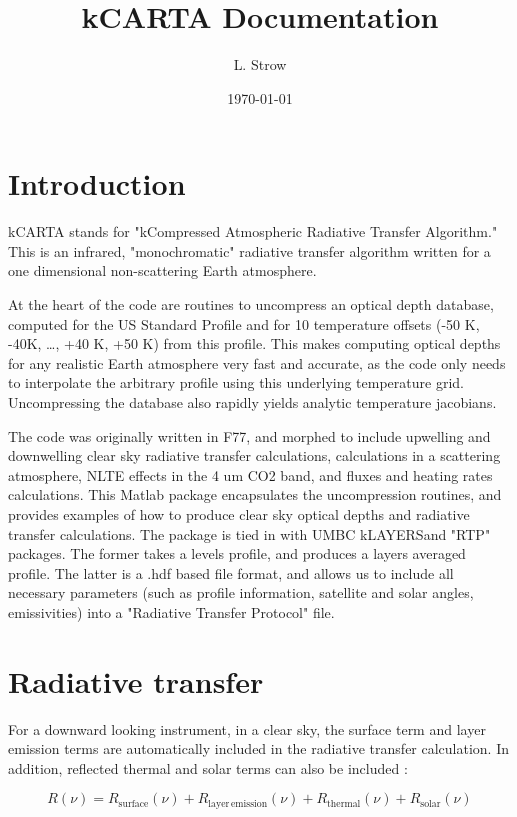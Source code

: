 \documentclass[11pt]{article}
\author{L. Strow}
\date{\today}
\title{kCARTA Documentation}
\begin{document}
\maketitle
\section{Introduction}
\label{sec-1}

kCARTA stands for "kCompressed Atmospheric Radiative Transfer
Algorithm." This is an infrared, "monochromatic" radiative transfer
algorithm written for a one dimensional non-scattering Earth atmosphere.

At the heart of the code are routines to uncompress an optical depth
database, computed for the US Standard Profile and for 10 temperature
offsets (-50 K, -40K, \ldots{}, +40 K, +50 K) from this profile. This makes
computing optical depths for any realistic Earth atmosphere very fast
and accurate, as the code only needs to interpolate the arbitrary
profile using this underlying temperature grid. Uncompressing the
database also rapidly yields analytic temperature jacobians.

The code was originally written in F77, and morphed to include upwelling
and downwelling clear sky radiative transfer calculations, calculations
in a scattering atmosphere, NLTE effects in the 4 um CO2 band, and
fluxes and heating rates calculations. This Matlab package encapsulates
the uncompression routines, and provides examples of how to produce
clear sky optical depths and radiative transfer calculations. The
package is tied in with UMBC kLAYERSand "RTP" packages. The former takes
a levels profile, and produces a layers averaged profile. The latter is
a .hdf based file format, and allows us to include all necessary
parameters (such as profile information, satellite and solar angles,
emissivities) into a "Radiative Transfer Protocol" file.

\section{Radiative transfer}
\label{sec-2}

For a downward looking instrument, in a clear sky, the surface term and
layer emission terms are automatically included in the radiative
transfer calculation. In addition, reflected thermal and solar terms can
also be included :

$$R(\nu) = R_{\mathrm{surface}}(\nu) + R_{\mathrm{layer\, emission}}(\nu) + 
R_{\mathrm{thermal}}(\nu) + R_{\mathrm{solar}}(\nu)$$
\end{document}
